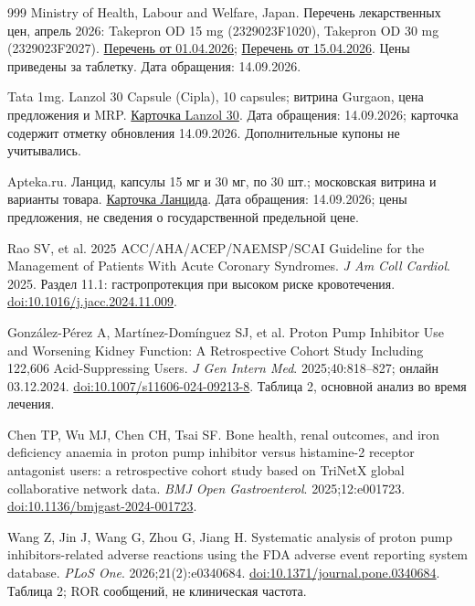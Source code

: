 \documentclass[11pt,a4paper,notitlepage]{report}
\begin{document}
\begin{thebibliography}{999}
 Ministry of Health, Labour and Welfare, Japan. Перечень лекарственных цен, апрель 2026: Takepron OD 15 mg (2329023F1020), Takepron OD 30 mg (2329023F2027). \href{https://www.mhlw.go.jp/topics/2026/04/dl/tp20260401-01_01.pdf}{Перечень от 01.04.2026}; \href{https://www.mhlw.go.jp/topics/2026/04/dl/tp20260415-01_01.pdf}{Перечень от 15.04.2026}. Цены приведены за таблетку. Дата обращения: 14.09.2026.

 Tata 1mg. Lanzol 30 Capsule (Cipla), 10 capsules; витрина Gurgaon, цена предложения и MRP. \href{https://www.1mg.com/drugs/lanzol-30-capsule-14655}{Карточка Lanzol 30}. Дата обращения: 14.09.2026; карточка содержит отметку обновления 14.09.2026. Дополнительные купоны не учитывались.

 Apteka.ru. Ланцид, капсулы 15 мг и 30 мг, по 30 шт.; московская витрина и варианты товара. \href{https://apteka.ru/product/lanczid-30-mg-30-sht-kapsuly-5e326aadca7bdc000192dfde/}{Карточка Ланцида}. Дата обращения: 14.09.2026; цены предложения, не сведения о государственной предельной цене.


 Rao SV, et al. 2025 ACC/AHA/ACEP/NAEMSP/SCAI Guideline for the Management of Patients With Acute Coronary Syndromes. \textit{J Am Coll Cardiol}. 2025. Раздел 11.1: гастропротекция при высоком риске кровотечения. \href{https://doi.org/10.1016/j.jacc.2024.11.009}{doi:10.1016/j.jacc.2024.11.009}.

 González-Pérez A, Martínez-Domínguez SJ, et al. Proton Pump Inhibitor Use and Worsening Kidney Function: A Retrospective Cohort Study Including 122,606 Acid-Suppressing Users. \textit{J Gen Intern Med}. 2025;40:818--827; онлайн 03.12.2024. \href{https://doi.org/10.1007/s11606-024-09213-8}{doi:10.1007/s11606-024-09213-8}. Таблица 2, основной анализ во время лечения.

 Chen TP, Wu MJ, Chen CH, Tsai SF. Bone health, renal outcomes, and iron deficiency anaemia in proton pump inhibitor versus histamine-2 receptor antagonist users: a retrospective cohort study based on TriNetX global collaborative network data. \textit{BMJ Open Gastroenterol}. 2025;12:e001723. \href{https://doi.org/10.1136/bmjgast-2024-001723}{doi:10.1136/bmjgast-2024-001723}.

 Wang Z, Jin J, Wang G, Zhou G, Jiang H. Systematic analysis of proton pump inhibitors-related adverse reactions using the FDA adverse event reporting system database. \textit{PLoS One}. 2026;21(2):e0340684. \href{https://doi.org/10.1371/journal.pone.0340684}{doi:10.1371/journal.pone.0340684}. Таблица 2; ROR сообщений, не клиническая частота.


\end{thebibliography}
\end{document}
